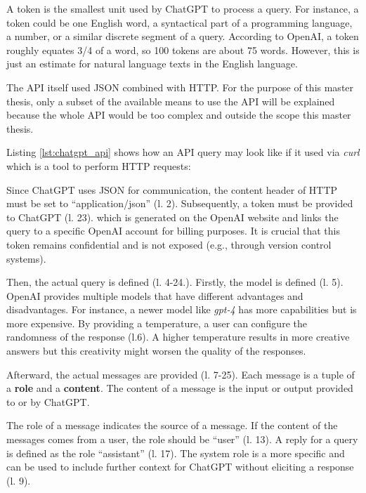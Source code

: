 A token is the smallest unit used by ChatGPT to process a query. For instance, a token could be one English word, a syntactical part of a programming language, a number, or a similar discrete segment of a query. According to OpenAI, a token roughly equates 3/4 of a word, so 100 tokens are about 75 words. However, this is just an estimate for natural language texts in the English language. 

The \ac{API} itself used JSON combined with \ac{HTTP}. For the purpose of this master thesis, only a subset of the available means to use the \ac{API} will be explained because the whole \ac{API} would be too complex and outside the scope this master thesis. 

Listing \ref{lst:chatgpt_api} shows how an \ac{API} query may look like if it used via \textit{curl} which is a tool to  perform \ac{HTTP} requests:

 \begin{figure} [htbp!]
 \centering
		\end{figure}
 

Since ChatGPT uses \ac{JSON} for communication, the content header of \ac{HTTP}  must be set to \enquote{application/json} (l. 2). Subsequently, a token must be provided to ChatGPT (l. 23). which is generated on the OpenAI website and links the query to a specific OpenAI account for billing purposes. It is crucial that this token remains confidential and is not exposed (e.g., through version control systems).

Then, the actual query is defined (l. 4-24.). Firstly, the model is defined (l. 5). OpenAI provides multiple models that have different advantages and disadvantages. For instance, a newer model like \textit{gpt-4} has more capabilities but is more expensive.  By providing a temperature, a user can configure the randomness of the response (l.6). A higher temperature results in more creative answers but this creativity might worsen the quality of the responses. 

Afterward, the actual messages are provided (l. 7-25). Each message is a tuple of a \textbf{role} and a \textbf{content}. The content of a message is the input or output provided to or by ChatGPT. 

The role of a message indicates the source of a message. If the content of the messages comes from a user, the role should be \enquote{user} (l. 13). A reply for a query is defined as the role \enquote{assistant} (l. 17). The system role is a more specific and can be used to include further context for ChatGPT without eliciting a response (l. 9).

